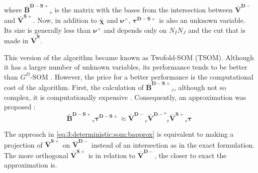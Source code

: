 			\noindent where $\mathbf{\bar{B}^{D-S+}}_s$ is the matrix with the bases from the intersection between $\mathbf{\bar{V}^{D-}}$ and $\mathbf{\bar{V}^{S+}}$. Now, in addition to $\boldsymbol{\bar{\chi}}$ and $\boldsymbol{\nu}^+$, $\boldsymbol{\tau^{D-S+}}$ is also an unknown variable. Its size is generally less than $\boldsymbol{\nu}^+$ and depends only on $N_IN_J$ and the cut that is made in $\mathbf{\bar{V}^S}$.
			
			This version of the algorithm became known as Twofold-SOM (TSOM). Although it has a larger number of unknown variables, its performance tends to be better than $G^D$-SOM \citep{chen2017}. However, the price for a better performance is the computational cost of the algorithm. First, the calculation of $\mathbf{\bar{B}^{D-S+}}_s$, although not so complex, it is computationally expensive \citep{zhong2010subspace}. Consequently, an approximation was proposed \citep{zhong2009twofold}:
			\begin{equation}
				\mathbf{\bar{B}^{D-S+}}_s\boldsymbol{\tau^{D-S+}} \approx \mathbf{\bar{V}^{D-}}_s\mathbf{\bar{V}^{D-*}}_s\mathbf{\bar{V}^{S+}}_s\boldsymbol{\tau} \label{eq:3:deterministic:som:bapprox}
			\end{equation}
		
			The approach in \eqref{eq:3:deterministic:som:bapprox} is equivalent to making a projection of $\mathbf{\bar{V}^{S+}}$ on $\mathbf{\bar{V}^{D-}}$ instead of an intersection as in the exact formulation. The more orthogonal $\mathbf{\bar{V}^{S+}}$ is in relation to $\mathbf{\bar{V}^{D-}}$, the closer to exact the approximation is.
			
